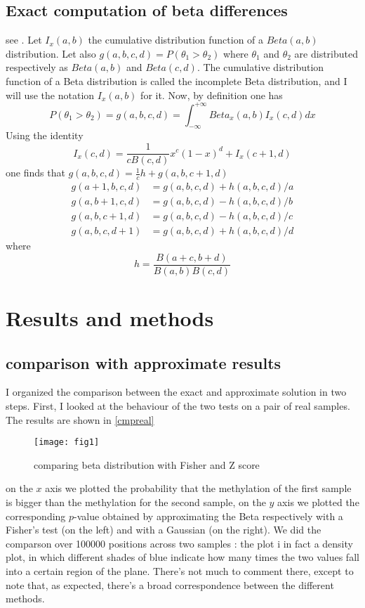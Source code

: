 \documentclass[11pt]{amsart}
\begin{document}
\subsection{Exact computation of beta differences}
see .
Let $I_x(a,b)$ the cumulative distribution function of a $Beta(a,b)$ distribution. Let also $g(a,b,c,d)=P(\theta_1>\theta_2)$ where $\theta_1$ and $\theta_2$ are distributed respectively as $Beta(a,b)$ and $Beta(c,d)$. The cumulative distribution function of a Beta distribution is called the incomplete Beta distribution, and I will use the notation $I_x(a,b)$ for it. Now, by definition one has \[P(\theta_1>\theta_2)=g(a,b,c,d)=\int_{-\infty}^{+\infty} Beta_x(a,b)I_x(c,d) dx\]
Using the identity \[I_x(c,d)=\frac{1}{cB(c,d)}x^c(1-x)^d+I_x(c+1,d)\] one finds that 
$g(a,b,c,d)=\frac{1}{c}h+g(a,b,c+1,d)$
\begin{align}
g(a+1,b,c,d) &= g(a,b,c,d) + h(a,b,c,d)/a \\
g(a,b+1,c,d) &= g(a,b,c,d) - h(a,b,c,d)/b \\
g(a,b,c+1,d) &= g(a,b,c,d) - h(a,b,c,d)/c \\
g(a,b,c,d+1) &= g(a,b,c,d) + h(a,b,c,d)/d 
\end{align}
where \[h=\frac{B(a+c,b+d)}{B(a,b)B(c,d)}\]
\section{Results and methods} 
\subsection{comparison with approximate results}
I organized the comparison between the exact and approximate solution in two steps. First,
I looked at the behaviour of the two tests on a pair of real samples. The results are shown in \ref{cmpreal}
\begin{figure}[h]
\caption{comparing beta distribution with Fisher and Z score}
\texttt{[image: fig1]}
\end{figure}\label{cmpreal}
on the $x$ axis we plotted the probability that the methylation of the first sample is bigger than the methylation for the second sample, on the $y$ axis we plotted the corresponding $p$-value obtained by approximating the Beta respectively with a Fisher's test (on the left) and with a Gaussian (on the right).
We did the comparson over 100000 positions across two samples : the plot i in fact a density plot, in which different shades of blue indicate how many times the two values fall into a certain region of the plane. There's not much to comment there, except to note that, as expected, there's a broad correspondence between the different methods.
\end{document}
